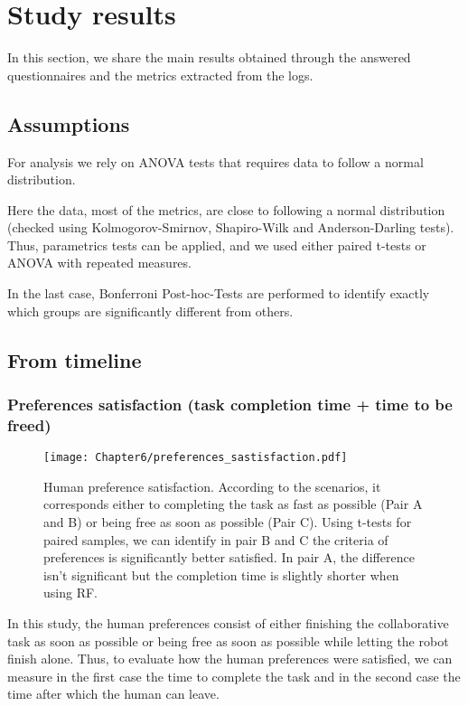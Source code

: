 \section{Study results}


In this section, we share the main results obtained through the answered questionnaires and the metrics extracted from the logs.

\subsection{Assumptions}

For analysis we rely on ANOVA tests that requires data to follow a normal distribution. 

Here the data, most of the metrics, are close to following a normal distribution (checked using Kolmogorov-Smirnov, Shapiro-Wilk and Anderson-Darling tests). Thus, parametrics tests can be applied, and we used either paired t-tests or ANOVA with repeated measures.

In the last case, Bonferroni Post-hoc-Tests are performed to identify exactly which groups are significantly different from others.



\subsection{From timeline}

\subsubsection*{Preferences satisfaction (task completion time + time to be freed)}

\begin{figure}
    \center
    \texttt{[image: Chapter6/preferences\_sastisfaction.pdf]}
    \caption{Human preference satisfaction. According to the scenarios, it corresponds either to completing the task as fast as possible (Pair A and B) or being free as soon as possible (Pair C). Using t-tests for paired samples, we can identify in pair B and C the criteria of preferences is significantly better satisfied. In pair A, the difference isn't significant but the completion time is slightly shorter when using RF.}
    \label{fig:preferences_satisfaction}
\end{figure}

In this study, the human preferences consist of either finishing the collaborative task as soon as possible or being free as soon as possible while letting the robot finish alone. 
Thus, to evaluate how the human preferences were satisfied, we can measure in the first case the time to complete the task and in the second case the time after which the human can leave. 

